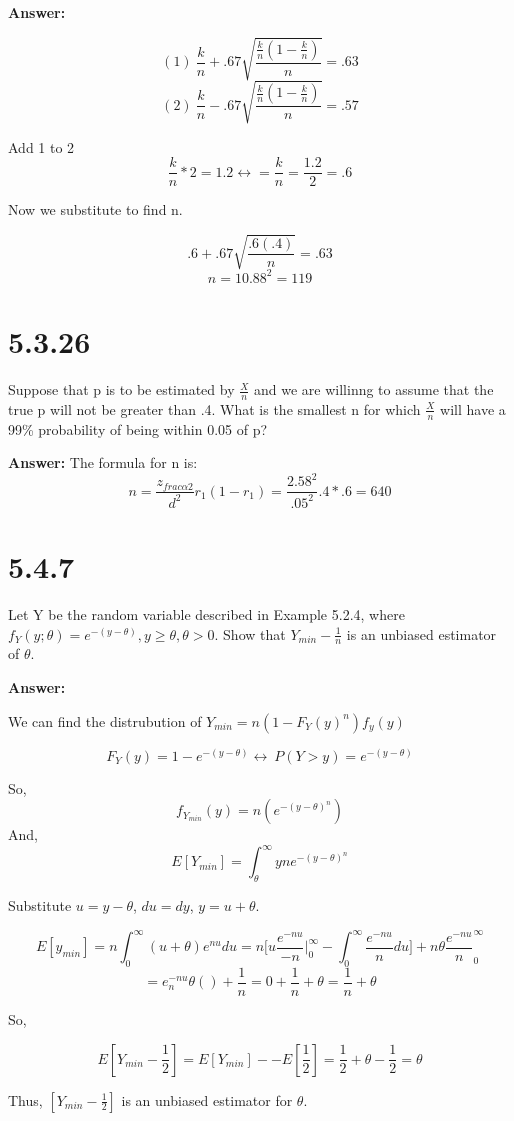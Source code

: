 \documentclass[11pt]{article}
\begin{document}
\textbf{Answer:}

$$(1) \ \frac{k}{n} + .67\sqrt{\frac{\frac{k}{n}(1-\frac{k}{n})}{n}} = .63$$
$$(2) \ \frac{k}{n} - .67\sqrt{\frac{\frac{k}{n}(1-\frac{k}{n})}{n}} = .57$$

Add 1 to 2
$$\frac{k}{n}*2 = 1.2 \leftrightarrow = \frac{k}{n} = \frac{1.2}{2}=.6$$

Now we substitute to find n.

$$ .6  + .67\sqrt{\frac{.6(.4)}{n}} = .63$$
$$n=10.88^2=119$$

\section{5.3.26}
Suppose that p is to be estimated by $\frac{X}{n}$ and we are willinng to assume that the true p will not be greater than .4. What is the smallest n for which $\frac{X}{n}$ will have a 99\% probability of being within 0.05 of p?

\textbf{Answer:}
The formula for n is:
$$n = \frac{z_{frac{\alpha}{2}}}{d^2}r_1(1-r_1)=\frac{2.58^2}{.05^2}.4*.6=640$$

\section{5.4.7}
Let Y be the random variable described in Example 5.2.4, where $f_Y(y; \theta) = e^{-(y-\theta)}, y \geq \theta, \theta > 0$. Show that $Y_{min } - \frac{1}{n}$ is an unbiased estimator of $\theta$.

\textbf{Answer:}

We can find the distrubution of $Y_{min} =n(1-F_{Y}(y)^n)f_y(y)$

$$F_{Y}(y)=1-e^{-(y-\theta)} \leftrightarrow \ P(Y>y)=e^{-(y-\theta)}$$

So,
$$f_{Y_{min}}(y)=n(e^{-(y-\theta)^n})$$
And,
$$E[Y_{min}]=\int^{\infty}_{\theta}yne^{-(y-\theta)^n}$$

Substitute $u=y-\theta$, $du=dy$, $y=u+\theta$.

$$E[y_{min}]=n\int_{0}^{\infty}(u+\theta)e^{nu}du = n \Big[ u \frac{e^{-nu}}{-n}\Big|^{\infty}_{0} -\int_{0}^{\infty} \frac{e^{-nu}}{n}du\Big]  +n\theta\frac{e^{-nu}}{n}^{\infty}_{0}$$
$$= e^{-nu}_n\theta()+\frac{1}{n} =0 + \frac{1}{n} +\theta = \frac{1}{n}+\theta$$

So,

$$E[Y_{min}-\frac{1}{2}]= E[Y_{min}]--E[\frac{1}{2}]=\frac{1}{2}+\theta - \frac{1}{2}=\theta$$

Thus, $[Y_{min}-\frac{1}{2}]$ is an unbiased estimator for $\theta$.
\end{document}
